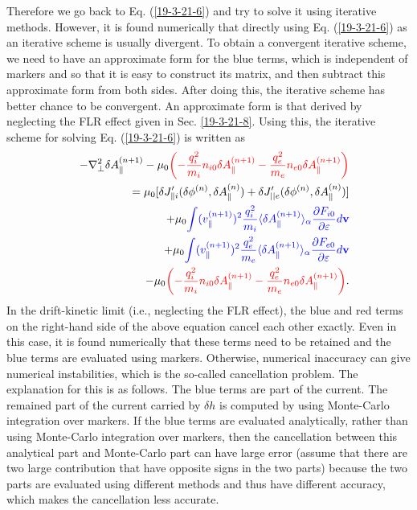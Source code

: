 \documentclass{article}
\newcommand{\tmcolor}[2]{{\color{#1}{#2}}}
\begin{document}
Therefore we go back to Eq. (\ref{19-3-21-6}) and try to solve it using
iterative methods. However, it is found numerically that directly using Eq.
(\ref{19-3-21-6}) as an iterative scheme is usually divergent. To obtain a
convergent iterative scheme, we need to have an approximate form for the blue
terms, which is independent of markers and so that it is easy to construct its
matrix, and then subtract this approximate form from both sides. After doing
this, the iterative scheme has better chance to be convergent. An approximate
form is that derived by neglecting the FLR effect given in Sec.
\ref{19-3-21-8}. Using this, the iterative scheme for solving Eq.
(\ref{19-3-21-6}) is written as
\begin{eqnarray}
  &  & - \nabla^2_{\perp} \delta A_{\parallel}^{(n + 1)} - \mu_0
  \tmcolor{red}{\left( - \frac{q^2_i}{m_i} n_{i 0} \delta A_{\parallel}^{(n +
  1)} - \frac{q^2_e}{m_e} n_{e 0} \delta A_{\parallel}^{(n + 1)} \right)}
  \nonumber\\
  &  & = \mu_0 [\delta J_{\parallel i}' (\delta \phi^{(n)}, \delta
  A_{\parallel}^{(n)}) + \delta J'_{||e} (\delta \phi^{(n)}, \delta
  A_{\parallel}^{(n)})] \nonumber\\
  &  & + \mu_0 \tmcolor{blue}{\int (v_{\parallel}^{(n + 1)})^2
  \frac{q^2_i}{m_i} \langle \delta A_{\parallel}^{(n + 1)} \rangle_{\alpha}
  \frac{\partial F_{i 0}}{\partial \varepsilon} d\mathbf{v}} \nonumber\\
  &  & + \mu_0 \tmcolor{blue}{\int (v_{\parallel}^{(n + 1)})^2
  \frac{q^2_e}{m_e} \langle \delta A_{\parallel}^{(n + 1)} \rangle_{\alpha}
  \frac{\partial F_{e 0}}{\partial \varepsilon} d\mathbf{v}} \nonumber\\
  &  & - \mu_0 \tmcolor{red}{\left( - \frac{q^2_i}{m_i} n_{i 0} \delta
  A_{\parallel}^{(n + 1)} - \frac{q^2_e}{m_e} n_{e 0} \delta A_{\parallel}^{(n
  + 1)} \right)} .  \label{19-3-21-p1}
\end{eqnarray}
In the drift-kinetic limit (i.e., neglecting the FLR effect), the blue and red
terms on the right-hand side of the above equation cancel each other exactly.
Even in this case, it is found numerically that these terms need to be
retained and the blue terms are evaluated using markers. Otherwise, numerical
inaccuracy can give numerical instabilities, which is the so-called
cancellation problem. The explanation for this is as follows. The blue terms
are part of the current. The remained part of the current carried by $\delta
h$ is computed by using Monte-Carlo integration over markers. If the blue
terms are evaluated analytically, rather than using Monte-Carlo integration
over markers, then the cancellation between this analytical part and
Monte-Carlo part can have large error (assume that there are two large
contribution that have opposite signs in the two parts) because the two parts
are evaluated using different methods and thus have different accuracy, which
makes the cancellation less accurate.
\end{document}
